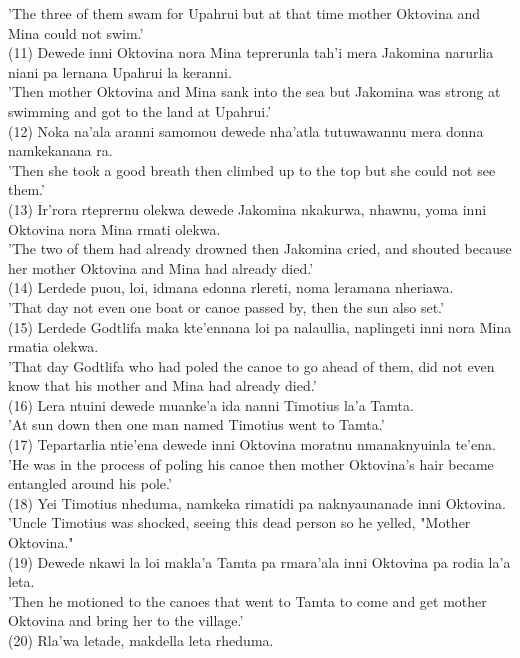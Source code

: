\documentclass[10pt]{article}
\begin{document}
'The three of them swam for Upahrui but at that time mother Oktovina and Mina could not swim.'\\
(11) Dewede inni Oktovina nora Mina teprerunla tah'i mera Jakomina narurlia niani pa lernana Upahrui la keranni.\\
'Then mother Oktovina and Mina sank into the sea but Jakomina was strong at swimming and got to the land at Upahrui.'\\
(12) Noka na'ala aranni samomou dewede nha'atla tutuwawannu mera donna namkekanana ra.\\
'Then she took a good breath then climbed up to the top but she could not see them.'\\
(13) Ir'rora rteprernu olekwa dewede Jakomina nkakurwa, nhawnu, yoma inni Oktovina nora Mina rmati olekwa.\\
'The two of them had already drowned then Jakomina cried, and shouted because her mother Oktovina and Mina had already died.'\\
(14) Lerdede puou, loi, idmana edonna rlereti, noma leramana nheriawa.\\
'That day not even one boat or canoe passed by, then the sun also set.'\\
(15) Lerdede Godtlifa maka kte'ennana loi pa nalaullia, naplingeti inni nora Mina rmatia olekwa.\\
'That day Godtlifa who had poled the canoe to go ahead of them, did not even know that his mother and Mina had already died.'\\
(16) Lera ntuini dewede muanke'a ida nanni Timotius la'a Tamta.\\
'At sun down then one man named Timotius went to Tamta.'\\
(17) Tepartarlia ntie'ena dewede inni Oktovina moratnu nmanaknyuinla te'ena.\\
'He was in the process of poling his canoe then mother Oktovina's hair became entangled around his pole.'\\
(18) Yei Timotius nheduma, namkeka rimatidi pa naknyaunanade inni Oktovina.\\
'Uncle Timotius was shocked, seeing this dead person so he yelled, "Mother Oktovina."\\
(19) Dewede nkawi la loi makla'a Tamta pa rmara'ala inni Oktovina pa rodia la'a leta.\\
'Then he motioned to the canoes that went to Tamta to come and get mother Oktovina and bring her to the village.'\\
(20) Rla'wa letade, makdella leta rheduma.\\
\end{document}

